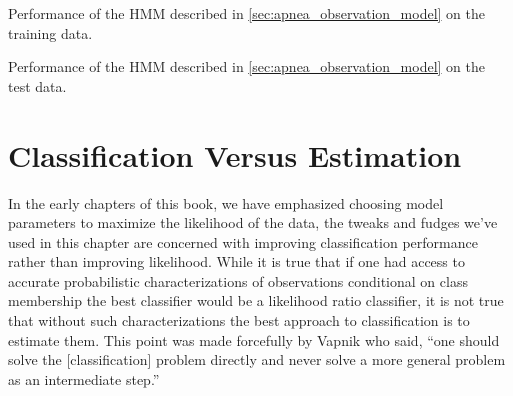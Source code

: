 \begin{table*}
  \centering
  
  \caption[Performance]{Performance of the HMM described in
    \ref{sec:apnea_observation_model} on the training data.}
  \label{tab:score}
\end{table*}

\begin{table*}
  \centering
  
  \caption[Performance]{Performance of the HMM described in
    \ref{sec:apnea_observation_model} on the test data.}
  \label{tab:test_score}
\end{table*}

\section{Classification Versus Estimation}
\label{sec:ClassVsEst}

In the early chapters of this book, we have emphasized choosing model
parameters to maximize the likelihood of the data, the tweaks and
fudges we've used in this chapter are concerned with improving
classification performance rather than improving likelihood.  While it
is true that if one had access to accurate probabilistic
characterizations of observations conditional on class membership the
best classifier would be a likelihood ratio classifier, it is not true
that without such characterizations the best approach to
classification is to estimate them.  This point was made forcefully by
Vapnik\cite{Vapnik98} who said, ``one should solve the
[classification] problem directly and never solve a more general
problem as an intermediate step.''

